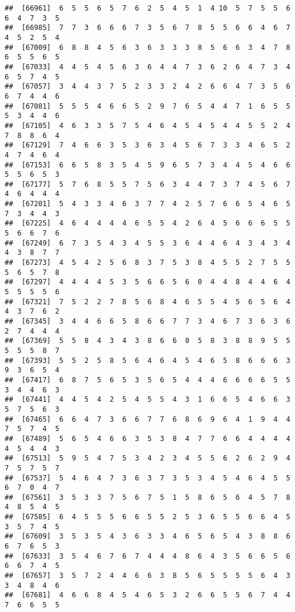 \documentclass[
]{book}
\begin{document}
\begin{verbatim}
##  [66961]  6  5  5  6  5  7  6  2  5  4  5  1  4 10  5  7  5  5  6  6  4  7  3  5
##  [66985]  7  7  3  6  6  6  7  3  5  6  7  8  5  5  6  6  4  6  7  4  5  2  5  4
##  [67009]  6  8  8  4  5  6  3  6  3  3  3  8  5  6  6  3  4  7  8  6  5  5  6  5
##  [67033]  4  4  5  4  5  6  3  6  4  4  7  3  6  2  6  4  7  3  4  6  5  7  4  5
##  [67057]  3  4  4  3  7  5  2  3  3  2  4  2  6  6  4  7  3  5  6  6  7  4  4  6
##  [67081]  5  5  5  4  6  6  5  2  9  7  6  5  4  4  7  1  6  5  5  5  3  4  4  6
##  [67105]  4  6  3  3  5  7  5  4  6  4  5  4  5  4  4  5  5  2  4  7  8  8  6  4
##  [67129]  7  4  6  6  3  5  3  6  3  4  5  6  7  3  3  4  6  5  2  4  7  4  6  4
##  [67153]  6  6  5  8  3  5  4  5  9  6  5  7  3  4  4  5  4  6  6  5  5  6  5  3
##  [67177]  5  7  6  8  5  5  7  5  6  3  4  4  7  3  7  4  5  6  7  4  6  4  4  4
##  [67201]  5  4  3  3  4  6  3  7  7  4  2  5  7  6  6  5  4  6  5  7  3  4  4  3
##  [67225]  4  6  4  4  4  4  6  5  5  4  2  6  4  5  6  6  6  5  5  5  6  6  7  6
##  [67249]  6  7  3  5  4  3  4  5  5  3  6  4  4  6  4  3  4  3  4  4  3  8  7  7
##  [67273]  4  5  4  2  5  6  8  3  7  5  3  8  4  5  5  2  7  5  5  5  6  5  7  8
##  [67297]  4  4  4  4  5  3  5  6  6  5  6  0  4  4  8  4  4  6  4  5  5  5  5  6
##  [67321]  7  5  2  2  7  8  5  6  8  4  6  5  5  4  5  6  5  6  4  4  3  7  6  2
##  [67345]  3  4  4  6  6  5  8  6  6  7  7  3  4  6  7  3  6  3  6  2  7  4  4  4
##  [67369]  5  5  8  4  3  4  3  8  6  6  0  5  8  3  8  8  9  5  5  5  5  5  8  7
##  [67393]  5  5  2  5  8  5  6  4  6  4  5  4  6  5  8  6  6  6  3  9  3  6  5  4
##  [67417]  6  8  7  5  6  5  3  5  6  5  4  4  4  6  6  6  6  5  5  3  4  4  6  3
##  [67441]  4  4  5  4  2  5  4  5  5  4  3  1  6  6  5  4  6  6  3  5  7  5  6  3
##  [67465]  6  6  4  7  3  6  6  7  7  6  8  6  9  6  4  1  9  4  4  7  5  7  4  5
##  [67489]  5  6  5  4  6  6  3  5  3  8  4  7  7  6  6  4  4  4  4  4  5  4  4  3
##  [67513]  5  9  5  4  7  5  3  4  2  3  4  5  5  6  2  6  2  9  4  7  5  7  5  7
##  [67537]  5  4  6  4  7  3  6  3  7  3  5  3  4  5  4  6  4  5  5  6  7  0  4  7
##  [67561]  3  5  3  3  7  5  6  7  5  1  5  8  6  5  6  4  5  7  8  4  8  5  4  5
##  [67585]  6  4  5  5  5  6  6  5  5  2  5  3  6  5  5  6  6  4  5  3  5  7  4  5
##  [67609]  3  5  3  5  4  3  6  3  3  4  6  5  6  5  4  3  8  8  6  6  7  6  5  3
##  [67633]  3  5  4  6  7  6  7  4  4  4  8  6  4  3  5  6  6  5  6  6  6  7  4  5
##  [67657]  3  5  7  2  4  4  6  6  3  8  5  6  5  5  5  5  6  4  3  3  4  8  4  6
##  [67681]  4  6  6  8  4  5  4  6  5  3  2  6  6  5  5  6  7  4  4  7  6  6  5  5

\end{verbatim}
\end{document}
